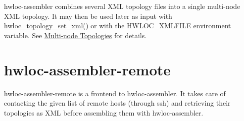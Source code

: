 hwloc-\/assembler combines several XML topology files into a single multi-\/node XML topology. It may then be used later as input with \hyperlink{a00044_ga93efcc8a962afe1ed23393700682173f}{hwloc\_\-topology\_\-set\_\-xml()} or with the HWLOC\_\-XMLFILE environment variable. See \hyperlink{a00006}{Multi-\/node Topologies} for details.\hypertarget{a00002_cli_hwloc_assembler_remote}{}\section{hwloc-\/assembler-\/remote}\label{a00002_cli_hwloc_assembler_remote}
hwloc-\/assembler-\/remote is a frontend to hwloc-\/assembler. It takes care of contacting the given list of remote hosts (through ssh) and retrieving their topologies as XML before assembling them with hwloc-\/assembler. 